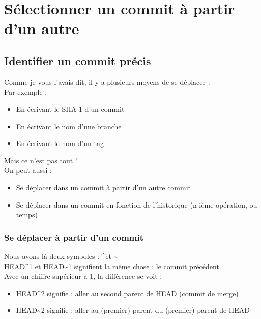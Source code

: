 \newpage
\section{Sélectionner un commit à partir d'un autre}
\subsection{Identifier un commit précis}

Comme je vous l'avais dit, il y a plusieurs moyens de se déplacer : \\

Par exemple :\\
\begin{itemize}
\item En écrivant le SHA-1 d'un commit
\item En écrivant le nom d'une branche
\item En écrivant le nom d'un tag\\
\end{itemize}

Mais ce n'est pas tout !\\

On peut aussi :
\begin{itemize}
\item Se déplacer dans un commit à partir d'un autre commit
\item Se déplacer dans un commit en fonction de l'historique (n-ième opération, ou temps)
\end{itemize}

\subsubsection{Se déplacer à partir d'un commit}

Nous avons là deux symboles : \textasciicircum et \textasciitilde\\
HEAD\textasciicircum1 et HEAD\textasciitilde1 signifient la même chose : le commit précédent.\\

Avec un chiffre supérieur à 1, la différence se voit :
\begin{itemize}
\item HEAD\textasciicircum2 signifie : aller au second parent de HEAD (commit de merge)
\item HEAD\textasciitilde2 signifie : aller au (premier) parent du (premier) parent de HEAD\\
\end{itemize}

